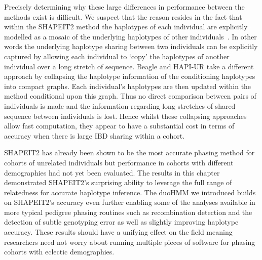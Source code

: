 Precisely determining why these large differences in performance between the methods exist is difficult. We suspect that the reason resides in the fact that within the SHAPEIT2 method the haplotypes of each individual are explicitly modelled as a mosaic of the underlying haplotypes of other individuals~\citep{li2003model}. In other words the underlying haplotype sharing between two individuals can be explicitly captured by allowing each individual to `copy' the haplotypes of another individual over a long stretch of sequence. Beagle and HAPI-UR take a different approach by collapsing the haplotype information of the conditioning haplotypes into compact graphs. Each individual's haplotypes are then updated within the method conditional upon this graph. Thus no direct comparison between pairs of individuals is made and the information regarding long stretches of shared sequence between individuals is lost.  Hence whilst these collapsing approaches allow fast computation, they appear to have a substantial cost in terms of accuracy when there is large IBD sharing within a cohort.

SHAPEIT2 has already been shown to be the most accurate phasing method for cohorts of unrelated individuals but performance in cohorts with different demographies had not yet been evaluated.  The results in this chapter demonstrated SHAPEIT2's surprising ability to leverage the full range of relatedness for accurate haplotype inference.  The duoHMM we introduced builds on SHAPEIT2's accuracy even further enabling some of the analyses available in more typical pedigree phasing routines such as recombination detection and the detection of subtle genotyping error as well as slightly improving haplotype accuracy.  These results should have a unifying effect on the field meaning researchers need not worry about running multiple pieces of software for phasing cohorts with eclectic demographies.


